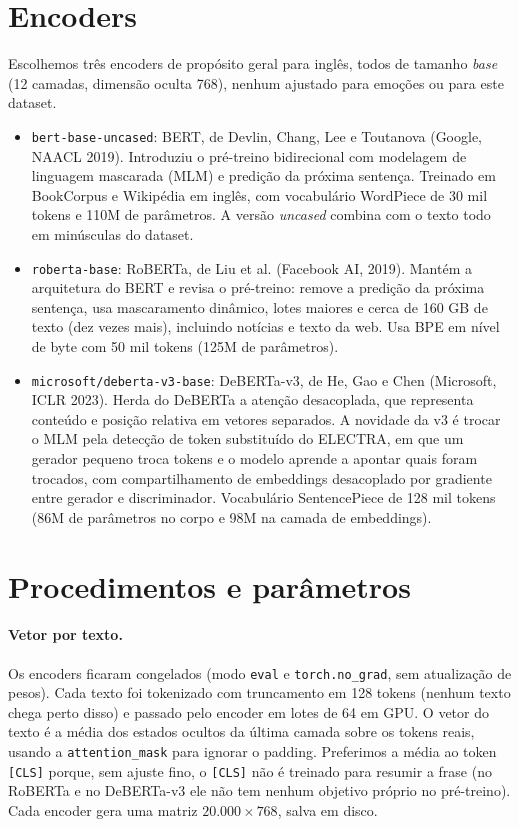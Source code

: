 \documentclass[11pt,a4paper]{article}
\begin{document}
\section{Encoders}

Escolhemos três encoders de propósito geral para inglês, todos de tamanho \textit{base} (12 camadas, dimensão oculta 768), nenhum ajustado para emoções ou para este dataset.

\begin{itemize}
\item \texttt{bert-base-uncased}: BERT, de Devlin, Chang, Lee e Toutanova (Google, NAACL 2019). Introduziu o pré-treino bidirecional com modelagem de linguagem mascarada (MLM) e predição da próxima sentença. Treinado em BookCorpus e Wikipédia em inglês, com vocabulário WordPiece de 30 mil tokens e 110M de parâmetros. A versão \textit{uncased} combina com o texto todo em minúsculas do dataset.
\item \texttt{roberta-base}: RoBERTa, de Liu et al. (Facebook AI, 2019). Mantém a arquitetura do BERT e revisa o pré-treino: remove a predição da próxima sentença, usa mascaramento dinâmico, lotes maiores e cerca de 160 GB de texto (dez vezes mais), incluindo notícias e texto da web. Usa BPE em nível de byte com 50 mil tokens (125M de parâmetros).
\item \texttt{microsoft/deberta-v3-base}: DeBERTa-v3, de He, Gao e Chen (Microsoft, ICLR 2023). Herda do DeBERTa a atenção desacoplada, que representa conteúdo e posição relativa em vetores separados. A novidade da v3 é trocar o MLM pela detecção de token substituído do ELECTRA, em que um gerador pequeno troca tokens e o modelo aprende a apontar quais foram trocados, com compartilhamento de embeddings desacoplado por gradiente entre gerador e discriminador. Vocabulário SentencePiece de 128 mil tokens (86M de parâmetros no corpo e 98M na camada de embeddings).
\end{itemize}

\section{Procedimentos e parâmetros}

\paragraph{Vetor por texto.} Os encoders ficaram congelados (modo \texttt{eval} e \texttt{torch.no\_grad}, sem atualização de pesos). Cada texto foi tokenizado com truncamento em 128 tokens (nenhum texto chega perto disso) e passado pelo encoder em lotes de 64 em GPU. O vetor do texto é a média dos estados ocultos da última camada sobre os tokens reais, usando a \texttt{attention\_mask} para ignorar o padding. Preferimos a média ao token \texttt{[CLS]} porque, sem ajuste fino, o \texttt{[CLS]} não é treinado para resumir a frase (no RoBERTa e no DeBERTa-v3 ele não tem nenhum objetivo próprio no pré-treino). Cada encoder gera uma matriz $20.000 \times 768$, salva em disco.
\end{document}
